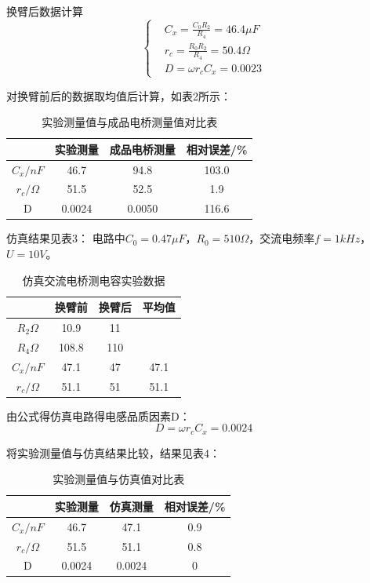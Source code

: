 \documentclass[10pt,a4paper,twocolumn,twoside,UTF8]{ctexart}
\begin{document}
换臂后数据计算
\[\left\{%
\begin{aligned}
&C_x=\frac{C_0 R_2}{R_4}=46.4\mu F\\
&r_c=\frac{R_0 R_2}{R_4}=50.4\Omega\\
&D=\omega r_c C_x=0.0023
\end{aligned}
\right.
\]

对换臂前后的数据取均值后计算，如表2所示：
\begin{table}[!h]
	\centering
	  \begin{tabular}{cccc}
	  \toprule
	     & 实验测量 & 成品电桥测量 & 相对误差/\% \\
	  \midrule
	  $C_x/nF$   & 46.7   & 94.8   & 103.0 \\
	  $r_c/\Omega$  & 51.5   & 52.5   & 1.9 \\
	  D  & 0.0024   & 0.0050   & 116.6 \\
	  \bottomrule
	  \end{tabular}%
	\caption{实验测量值与成品电桥测量值对比表}
	\label{tab:2}%
  \end{table}%

  仿真结果见表3：
  电路中$C_0=0.47\mu F$，$R_0=510\Omega$，交流电频率$f=1kHz$，$U=10V$。
  \begin{table}[!h]
	\centering
	  \begin{tabular}{cccc}
	  \toprule
	     & 换臂前 & 换臂后 & 平均值 \\
	  \midrule
	  $R_2\Omega$ & 10.9 &11 & \\
	  $R_4\Omega$ & 108.8 &110&\\
	  $C_x/nF$   & 47.1   & 47   & 47.1 \\
	  $r_c/\Omega$  &  51.1  & 51  & 51.1 \\
	  \bottomrule
	  \end{tabular}%
	\caption{仿真交流电桥测电容实验数据}
	\label{tab:3}%
  \end{table}%

由公式得仿真电路得电感品质因素D：
\begin{equation*}
	D=\omega r_c C_x=0.0024
\end{equation*}

将实验测量值与仿真结果比较，结果见表4：
\begin{table}[!h]
	\centering
	  \begin{tabular}{cccc}
	  \toprule
	     & 实验测量 & 仿真测量 & 相对误差/\% \\
	  \midrule
	  $C_x/nF$   & 46.7   & 47.1   & 0.9 \\
	  $r_c/\Omega$  & 51.5   & 51.1   & 0.8 \\
	  D  & 0.0024   & 0.0024   & 0 \\
	  \bottomrule
	  \end{tabular}%
	\caption{实验测量值与仿真值对比表}
	\label{tab:4}%
  \end{table}%
\end{document}
